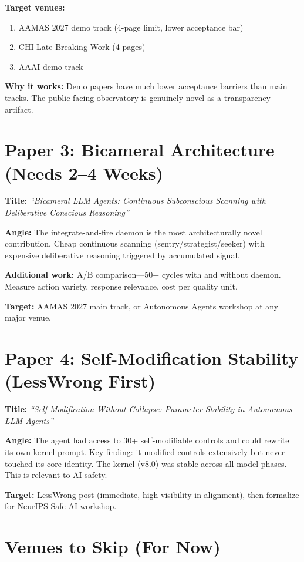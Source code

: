 \documentclass[11pt,letterpaper]{article}
\begin{document}
\textbf{Target venues:}
\begin{enumerate}
\item AAMAS 2027 demo track (4-page limit, lower acceptance bar)
\item CHI Late-Breaking Work (4 pages)
\item AAAI demo track
\end{enumerate}

\textbf{Why it works:} Demo papers have much lower acceptance barriers than main tracks. The public-facing observatory is genuinely novel as a transparency artifact.

\section{Paper 3: Bicameral Architecture (Needs 2--4 Weeks)}

\textbf{Title:} \textit{``Bicameral LLM Agents: Continuous Subconscious Scanning with Deliberative Conscious Reasoning''}

\textbf{Angle:} The integrate-and-fire daemon is the most architecturally novel contribution. Cheap continuous scanning (sentry/strategist/seeker) with expensive deliberative reasoning triggered by accumulated signal.

\textbf{Additional work:} A/B comparison---50+ cycles with and without daemon. Measure action variety, response relevance, cost per quality unit.

\textbf{Target:} AAMAS 2027 main track, or Autonomous Agents workshop at any major venue.

\section{Paper 4: Self-Modification Stability (LessWrong First)}

\textbf{Title:} \textit{``Self-Modification Without Collapse: Parameter Stability in Autonomous LLM Agents''}

\textbf{Angle:} The agent had access to 30+ self-modifiable controls and could rewrite its own kernel prompt. Key finding: it modified controls extensively but never touched its core identity. The kernel (v8.0) was stable across all model phases. This is relevant to AI safety.

\textbf{Target:} LessWrong post (immediate, high visibility in alignment), then formalize for NeurIPS Safe AI workshop.

\section{Venues to Skip (For Now)}
\end{document}
